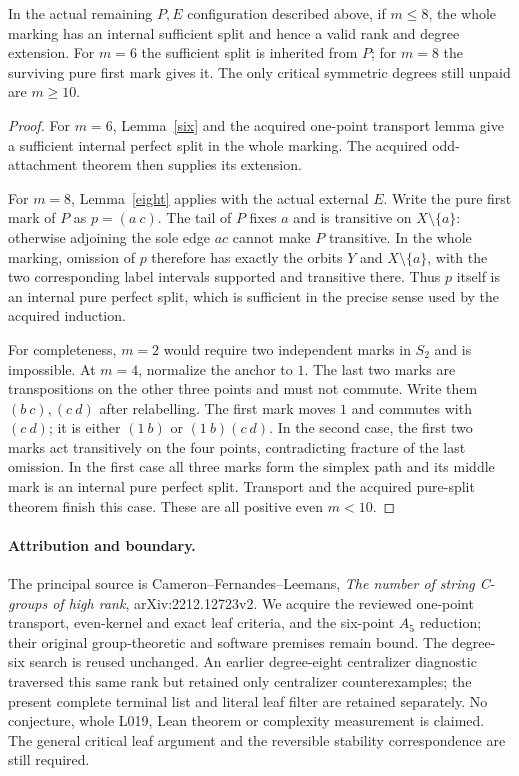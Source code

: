 \documentclass[11pt,a4paper]{article}
\begin{document}
\begin{theorem}
In the actual remaining $P,E$ configuration described above, if
$m\le8$, the whole marking has an internal sufficient split and hence
a valid rank and degree extension. For $m=6$ the sufficient split is
inherited from $P$; for $m=8$ the surviving pure first mark gives it.
The only critical symmetric degrees still unpaid are $m\ge10$.
\end{theorem}
\begin{proof}
For $m=6$, Lemma~\ref{six} and the acquired one-point transport
lemma give a sufficient internal perfect split in the whole marking.
The acquired odd-attachment theorem then supplies its extension.

For $m=8$, Lemma~\ref{eight} applies with the actual external $E$.
Write the pure first mark of $P$ as $p=(a\ c)$.
The tail of $P$ fixes $a$ and is transitive on $X\setminus\{a\}$:
otherwise adjoining the sole edge $ac$ cannot make $P$ transitive.
In the whole marking, omission of $p$ therefore has exactly the
orbits $Y$ and $X\setminus\{a\}$, with the two corresponding
label intervals supported and transitive there. Thus $p$ itself is
an internal pure perfect split, which is sufficient in the precise
sense used by the acquired induction.

For completeness, $m=2$ would require two independent marks in
$S_2$ and is impossible. At $m=4$, normalize the anchor to $1$.
The last two marks are transpositions on the other three points
and must not commute. Write them $(b\ c),(c\ d)$ after relabelling.
The first mark moves $1$ and commutes with $(c\ d)$; it is either
$(1\ b)$ or $(1\ b)(c\ d)$. In the second case, the first two
marks act transitively on the four points, contradicting fracture
of the last omission. In the first case all three marks form the
simplex path and its middle mark is an internal pure perfect split.
Transport and the acquired pure-split theorem finish this case.
These are all positive even $m<10$.
\end{proof}

\paragraph{Attribution and boundary.}
The principal source is Cameron--Fernandes--Leemans,
\emph{The number of string C-groups of high rank},
arXiv:2212.12723v2. We acquire the reviewed one-point transport,
even-kernel and exact leaf criteria, and the six-point $A_5$
reduction; their original group-theoretic and software premises
remain bound. The degree-six search is reused unchanged. An earlier
degree-eight centralizer diagnostic traversed this same rank but
retained only centralizer counterexamples; the present complete
terminal list and literal leaf filter are retained separately.
No conjecture, whole L019, Lean theorem or complexity measurement
is claimed. The general critical leaf argument and the reversible
stability correspondence are still required.
\end{document}
